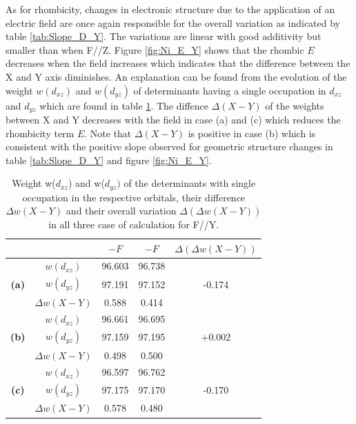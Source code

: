 \documentclass[10pt]{report}
\numberwithin{equation}{section}
\begin{document}
As for rhombicity, changes in electronic structure due to the application of an electric field are once again responsible for the overall variation as indicated by table \ref{tab:Slope_D_Y}.
The variations are linear with good additivity but smaller than when F//Z. 
Figure \ref{fig:Ni_E_Y} shows that the rhombic $E$ decreases when the field increases which indicates that the difference between the X and Y axis diminishes.
An explanation can be found from the evolution of the weight $w(d_{xz})$ and $w(d_{yz})$ of determinants having a single occupation in $d_{xz}$ and $d_{yz}$ which are found in table \ref{tab:PoidsY}.
The diffence $\Delta (X-Y)$ of the weights between X and Y decreases with the field in case (a) and (c) which reduces the rhombicity term $E$.
Note that $\Delta (X-Y)$ is positive in case (b) which is consistent with the positive slope observed for geometric structure changes in table \ref{tab:Slope_D_Y} and figure \ref{fig:Ni_E_Y}.


\begin{table}[h]
    \centering
    \begin{tabular}{c | c | c c | c }
        & &  $-F$ & $-F$ & $\Delta (\Delta w(X-Y))$\\
        \hline
        \multirow{3}{*}{\textbf{(a)}}
        &$w(d_{xz})$ &  96.603 & 96.738 & \\
        &$w(d_{yz})$ &  97.191 & 97.152 & -0.174\\
        &$\Delta w(X-Y)$ & 0.588 & 0.414& \\
        \hline
        \multirow{3}{*}{\textbf{(b)}}
        &$w(d_{xz})$ &  96.661 & 96.695 & \\
        &$w(d_{yz})$ &  97.159 & 97.195 & +0.002\\
        &$\Delta w(X-Y)$ & 0.498 & 0.500& \\
        \hline
        \multirow{3}{*}{\textbf{(c)}}
        &$w(d_{xz})$ &  96.597 & 96.762 & \\
        &$w(d_{yz})$ &  97.175 & 97.170 & -0.170\\
        &$\Delta w(X-Y)$ & 0.578 & 0.480& \\
        \hline
    \end{tabular}
    \caption{Weight w($d_{xz}$) and w($d_{yz})$ of the determinants with single occupation in the respective orbitals, their difference $\Delta w(X-Y)$ and their overall variation $\Delta (\Delta w(X-Y))$ in all three case of calculation for F//Y.}
    \label{tab:PoidsY}
\end{table}
\end{document}
